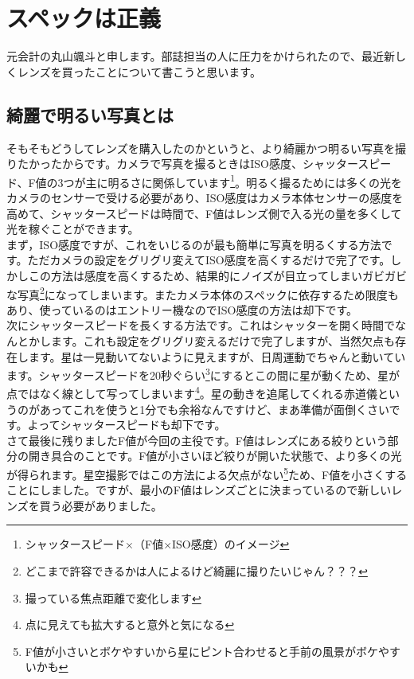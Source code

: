 \documentclass[../../super_nova_2023]{subfiles}
\begin{document}
\chapter{スペックは正義}
元会計の丸山颯斗と申します。部誌担当の人に圧力をかけられたので、最近新しくレンズを買ったことについて書こうと思います。\\
\section{綺麗で明るい写真とは}
そもそもどうしてレンズを購入したのかというと、より綺麗かつ明るい写真を撮りたかったからです。カメラで写真を撮るときはISO感度、シャッタースピード、F値の3つが主に明るさに関係しています\footnote{シャッタースピード×（F値×ISO感度）のイメージ}。明るく撮るためには多くの光をカメラのセンサーで受ける必要があり、ISO感度はカメラ本体センサーの感度を高めて、シャッタースピードは時間で、F値はレンズ側で入る光の量を多くして光を稼ぐことができます。\\
まず，ISO感度ですが、これをいじるのが最も簡単に写真を明るくする方法です。ただカメラの設定をグリグリ変えてISO感度を高くするだけで完了です。しかしこの方法は感度を高くするため、結果的にノイズが目立ってしまいガビガビな写真\footnote{どこまで許容できるかは人によるけど綺麗に撮りたいじゃん？？？}になってしまいます。またカメラ本体のスペックに依存するため限度もあり、使っているのはエントリー機なのでISO感度の方法は却下です。\\
次にシャッタースピードを長くする方法です。これはシャッターを開く時間でなんとかします。これも設定をグリグリ変えるだけで完了しますが、当然欠点も存在します。星は一見動いてないように見えますが、日周運動でちゃんと動いています。シャッタースピードを20秒ぐらい\footnote{撮っている焦点距離で変化します}にするとこの間に星が動くため、星が点ではなく線として写ってしまいます\footnote{点に見えても拡大すると意外と気になる}。星の動きを追尾してくれる赤道儀というのがあってこれを使うと1分でも余裕なんですけど、まあ準備が面倒くさいです。よってシャッタースピードも却下です。\\
さて最後に残りましたF値が今回の主役です。F値はレンズにある絞りという部分の開き具合のことです。F値が小さいほど絞りが開いた状態で、より多くの光が得られます。星空撮影ではこの方法による欠点がない\footnote{F値が小さいとボケやすいから星にピント合わせると手前の風景がボケやすいかも}ため、F値を小さくすることにしました。ですが、最小のF値はレンズごとに決まっているので新しいレンズを買う必要がありました。
\end{document}
